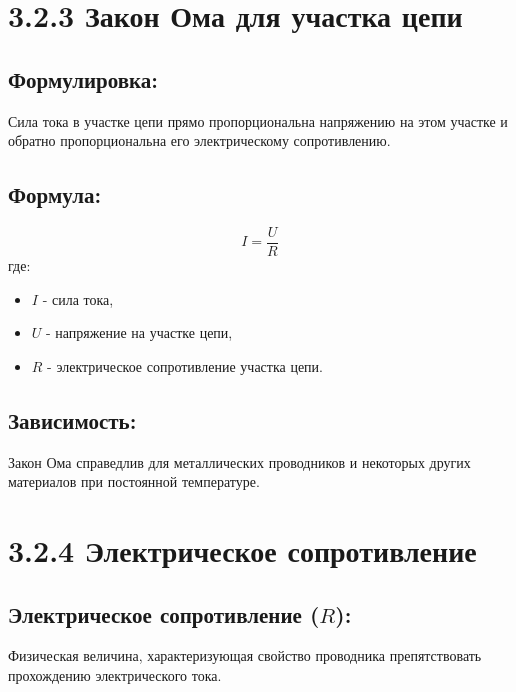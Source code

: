 \documentclass[a4paper,12pt]{article}
\begin{document}
\section*{3.2.3 Закон Ома для участка цепи}
\vspace{-9pt}
\subsection*{Формулировка:}
\vspace{-3pt}
Сила тока в участке цепи прямо пропорциональна напряжению на этом участке и обратно пропорциональна его электрическому сопротивлению.

\vspace{-9pt}
\subsection*{Формула:}
\vspace{-3pt}
\vspace{-0.05em}
$$ I = \frac{U}{R} $$
где:
\begin{itemize}
    \item $I$ - сила тока,
   \item $U$ - напряжение на участке цепи,
    \item $R$ - электрическое сопротивление участка цепи.
\end{itemize}


\vspace{-9pt}
\subsection*{Зависимость:}
\vspace{-3pt}
Закон Ома справедлив для металлических проводников и некоторых других материалов при постоянной температуре.

\newpage
\section*{3.2.4 Электрическое сопротивление}
\vspace{-9pt}
\subsection*{Электрическое сопротивление ($R$):}
\vspace{-3pt}
Физическая величина, характеризующая свойство проводника препятствовать прохождению электрического тока.

\vspace{-9pt}
\end{document}
